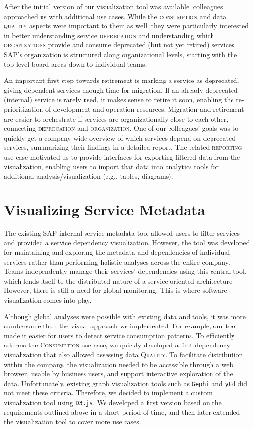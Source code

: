 \documentclass[conference]{IEEEtran}
\begin{document}
After the initial version of our visualization tool was available, colleagues approached us with additional use cases.
While the \textsc{consumption} and data \textsc{quality} aspects were important to them as well, they were particularly interested in better understanding service \textsc{deprecation} and understanding which \textsc{organizations} provide and consume deprecated (but not yet retired) services.
SAP's organization is structured along organizational levels, starting with the top-level board areas down to individual teams.

An important first step towards retirement is marking a service as deprecated, giving dependent services enough time for migration.
If an already deprecated (internal) service is rarely used, it makes sense to retire it soon, enabling the re-prioritization of development and operation resources.
Migration and retirement are easier to orchestrate if services are organizationally close to each other, connecting \textsc{deprecation} and \textsc{organization}.
One of our colleagues' goals was to quickly get a company-wide overview of which services depend on deprecated services, summarizing their findings in a detailed report.
The related \textsc{reporting} use case motivated us to provide interfaces for exporting filtered data from the visualization, enabling users to import that data into analytics tools for additional analysis/visualization (e.g., tables, diagrams).

\section{Visualizing Service Metadata}
\label{sec:visualization}

The existing SAP-internal service metadata tool allowed users to filter services and provided a service dependency visualization.
However, the tool was developed for maintaining and exploring the metadata and dependencies of individual services rather than performing holistic analyses across the entire company.
Teams independently manage their services' dependencies using this central tool, which lends itself to the distributed nature of a service-oriented architecture.
However, there is still a need for global monitoring.
This is where software visualization comes into play.

Although global analyses were possible with existing data and tools, it was more cumbersome than the visual approach we implemented.
For example, our tool made it easier for users to detect service consumption patterns.
To efficiently address the \textsc{Consumption} use case, we quickly developed a first dependency visualization that also allowed assessing data \textsc{Quality}.
To facilitate distribution within the company, the visualization needed to be accessible through a web browser, usable by business users, and support interactive exploration of the data.
Unfortunately, existing graph visualization tools such as \texttt{Gephi} and \texttt{yEd} did not meet these criteria.
Therefore, we decided to implement a custom visualization tool using \texttt{D3.js}.
We developed a first version based on the requirements outlined above in a short period of time, and then later extended the visualization tool to cover more use cases.
\end{document}
